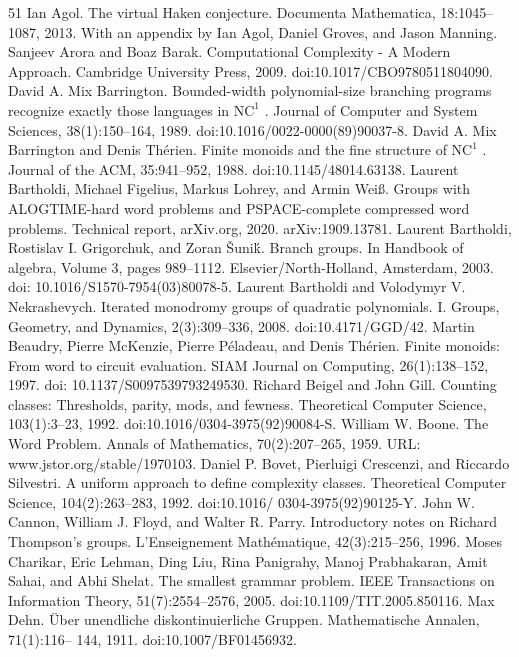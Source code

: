 \documentclass[10pt,a4paper]{article}
\begin{document}
\begin{thebibliography}{51}
 Ian Agol. The virtual Haken conjecture. Documenta Mathematica, 18:1045–1087, 2013. With an appendix by Ian Agol, Daniel Groves, and Jason Manning.
 Sanjeev Arora and Boaz Barak. Computational Complexity - A Modern Approach. Cambridge University Press, 2009. doi:10.1017/CBO9780511804090.
 David A. Mix Barrington. Bounded-width polynomial-size branching programs recognize exactly those languages in $\mathrm{NC}^1$ . Journal of Computer and System Sciences, 38(1):150–164, 1989. doi:10.1016/0022-0000(89)90037-8.
 David A. Mix Barrington and Denis Thérien. Finite monoids and the fine structure of $\mathrm{NC}^1$ . Journal of the ACM, 35:941–952, 1988. doi:10.1145/48014.63138.
 Laurent Bartholdi, Michael Figelius, Markus Lohrey, and Armin Weiß. Groups with ALOGTIME-hard word problems and PSPACE-complete compressed word problems. Technical report, arXiv.org, 2020. arXiv:1909.13781.
 Laurent Bartholdi, Rostislav I. Grigorchuk, and Zoran Šuniḱ. Branch groups. In Handbook of algebra, Volume 3, pages 989–1112. Elsevier/North-Holland, Amsterdam, 2003. doi: 10.1016/S1570-7954(03)80078-5.
 Laurent Bartholdi and Volodymyr V. Nekrashevych. Iterated monodromy groups of quadratic polynomials. I. Groups, Geometry, and Dynamics, 2(3):309–336, 2008. doi:10.4171/GGD/42.
 Martin Beaudry, Pierre McKenzie, Pierre Péladeau, and Denis Thérien. Finite monoids: From word to circuit evaluation. SIAM Journal on Computing, 26(1):138–152, 1997. doi: 10.1137/S0097539793249530.
 Richard Beigel and John Gill. Counting classes: Thresholds, parity, mods, and fewness. Theoretical Computer Science, 103(1):3–23, 1992. doi:10.1016/0304-3975(92)90084-S.
 William W. Boone. The Word Problem. Annals of Mathematics, 70(2):207–265, 1959. URL: www.jstor.org/stable/1970103.
 Daniel P. Bovet, Pierluigi Crescenzi, and Riccardo Silvestri. A uniform approach to define complexity classes. Theoretical Computer Science, 104(2):263–283, 1992. doi:10.1016/ 0304-3975(92)90125-Y.
 John W. Cannon, William J. Floyd, and Walter R. Parry. Introductory notes on Richard Thompson’s groups. L’Enseignement Mathématique, 42(3):215–256, 1996.
 Moses Charikar, Eric Lehman, Ding Liu, Rina Panigrahy, Manoj Prabhakaran, Amit Sahai, and Abhi Shelat. The smallest grammar problem. IEEE Transactions on Information Theory, 51(7):2554–2576, 2005. doi:10.1109/TIT.2005.850116.
 Max Dehn. Über unendliche diskontinuierliche Gruppen. Mathematische Annalen, 71(1):116– 144, 1911. doi:10.1007/BF01456932.

\end{thebibliography}
\end{document}
